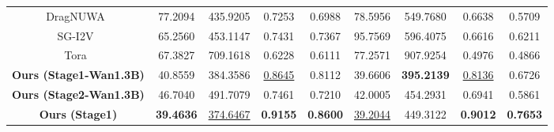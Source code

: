 \begin{table}[h]
{\begin{tabular}{c|cccc|cccc}
DragNUWA~\cite{yin2023dragnuwa}                                 & 77.2094                              & 435.9205                              & 0.7253                                    & 0.6988                                    & 78.5956                              & 549.7680                              & 0.6638                                    & 0.5709                                   \\
SG-I2V~\cite{namekata2024sgi2v}                                 & 65.2560                               & 453.1147                              & 0.7431                                    & 0.7367                                    & 95.7569                              & 596.4075                              & 0.6616                                    & 0.6211                                   \\
Tora~\cite{zhang2025tora} & 67.3827                              & 709.1618                              & 0.6228                                    & 0.6111                                    & 77.2571                              & 907.9254                              & 0.4976                                    & 0.4866                                   \\ \hline
\textbf{Ours (Stage1-Wan1.3B)}                                                        & 40.8559                          & 384.3586                          & \underline{0.8645}                          & 0.8112                          & 39.6606                          & \textbf{395.2139}                          & \underline{0.8136}                          & 0.6726                          \\
\textbf{Ours (Stage2-Wan1.3B)}                                                        & 46.7040                          & 491.7079                          & 0.7461                          & 0.7210                          & 42.0005                          & 454.2931                          & 0.6941                          & 0.5861                          \\ \hline
\textbf{Ours (Stage1)}                                                                                                                    & \textbf{39.4636}                               & \underline{374.6467}                              & \textbf{0.9155}                                    & \textbf{0.8600}                                    & \underline{39.2044}                               & 449.3122                              & \textbf{0.9012}                                    & \textbf{0.7653}                                   \\

\end{tabular}}
\end{table}
